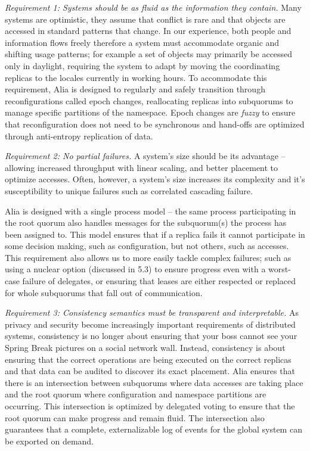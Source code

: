 \documentclass[sigplan,screen,review,anonymous,nonacm]{acmart}
\begin{document}
\emph{Requirement 1: Systems should be as fluid as the information they contain.}
Many systems are optimistic, they assume that conflict is rare and that objects are 
accessed in standard patterns that change. 
In our experience, both people and information flows freely therefore a system must
accommodate organic and shifting usage patterns; for example a set of objects may 
primarily be accessed only in daylight, requiring the system to adapt by moving the
coordinating replicas to the locales currently in working hours. 
To accommodate this requirement, Alia is designed to regularly and safely transition 
through reconfigurations called epoch changes, reallocating replicas into subquorums 
to manage specific partitions of the namespace. 
Epoch changes are \emph{fuzzy} to ensure that reconfiguration does not need to be
synchronous and hand-offs are optimized through anti-entropy replication of data. 

\emph{Requirement 2: No partial failures.}
A system's size should be its advantage -- allowing increased throughput with linear
scaling, and better placement to optimize accesses. 
Often, however, a system's size increases its complexity and it's susceptibility 
to unique failures such as correlated cascading failure. 

Alia is designed with a single process model -- the same process participating in 
the root quorum also handles messages for the subquorum(s) the process has been 
assigned to. 
This model ensures that if a replica fails it cannot participate in some decision 
making, such as configuration, but not others, such as accesses. 
This requirement also allows us to more easily tackle complex failures; such as 
using a nuclear option (discussed in 5.3) to ensure progress even with a worst-case
failure of delegates, or ensuring that leases are either respected or replaced 
for whole subquorums that fall out of communication. 

\emph{Requirement 3: Consistency semantics must be transparent and interpretable.}
As privacy and security become increasingly important requirements of distributed 
systems, consistency is no longer about ensuring that your boss cannot see your 
Spring Break pictures on a social network wall. 
Instead, consistency is about ensuring that the correct operations are being 
executed on the correct replicas and that data can be audited to discover its
exact placement. 
Alia ensures that there is an intersection between subquorums where data accesses 
are taking place and the root quorum where configuration and namespace partitions 
are occurring. 
This intersection is optimized by delegated voting to ensure that the root 
quorum can make progress and remain fluid.
The intersection also guarantees that a complete, externalizable log of events
for the global system can be exported on demand. 
\end{document}
